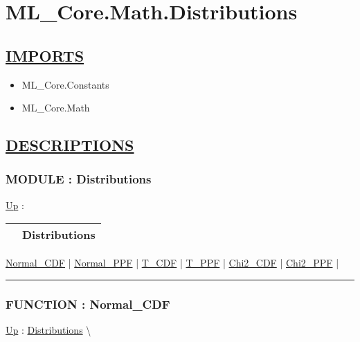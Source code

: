 \chapter*{ML\_Core.Math.Distributions}
\hypertarget{ecldoc:toc:ML_Core.Math.Distributions}{}

\section*{\underline{IMPORTS}}
\begin{itemize}
\item ML\_Core.Constants
\item ML\_Core.Math
\end{itemize}

\section*{\underline{DESCRIPTIONS}}
\subsection*{MODULE : Distributions}
\hypertarget{ecldoc:ML_Core.Math.Distributions}{}
\hyperlink{ecldoc:toc:ML_Core/Math}{Up} :

{\renewcommand{\arraystretch}{1.5}
\begin{tabularx}{\textwidth}{|>{\raggedright\arraybackslash}l|X|}
\hline
\hspace{0pt} & Distributions \\
\hline
\end{tabularx}
}

\par


\hyperlink{ecldoc:ml_core.math.distributions.normal_cdf}{Normal\_CDF}  |
\hyperlink{ecldoc:ml_core.math.distributions.normal_ppf}{Normal\_PPF}  |
\hyperlink{ecldoc:ml_core.math.distributions.t_cdf}{T\_CDF}  |
\hyperlink{ecldoc:ml_core.math.distributions.t_ppf}{T\_PPF}  |
\hyperlink{ecldoc:ml_core.math.distributions.chi2_cdf}{Chi2\_CDF}  |
\hyperlink{ecldoc:ml_core.math.distributions.chi2_ppf}{Chi2\_PPF}  |

\rule{\linewidth}{0.5pt}

\subsection*{FUNCTION : Normal\_CDF}
\hypertarget{ecldoc:ml_core.math.distributions.normal_cdf}{}
\hyperlink{ecldoc:ML_Core.Math.Distributions}{Up} :
\hspace{0pt} \hyperlink{ecldoc:ML_Core.Math.Distributions}{Distributions} \textbackslash 

